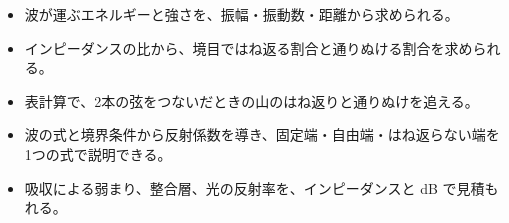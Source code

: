 
\begin{goal}
\begin{itemize}[label={\color{bkTheme}●}, leftmargin=1.6\zw, itemsep=0pt, topsep=1pt]
\item {}\enspace 波が運ぶエネルギーと強さを、振幅・振動数・距離から求められる。
\item {}\enspace インピーダンスの比から、境目ではね返る割合と通りぬける割合を求められる。
\item {}\enspace 表計算で、2本の弦をつないだときの山のはね返りと通りぬけを追える。
\item {}\enspace 波の式と境界条件から反射係数を導き、固定端・自由端・はね返らない端を1つの式で説明できる。
\item {}\enspace 吸収による弱まり、整合層、光の反射率を、インピーダンスと dB で見積もれる。
\end{itemize}
\end{goal}


